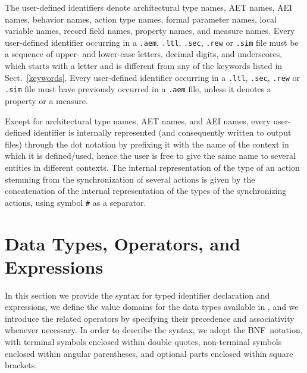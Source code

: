 The user-defined identifiers denote architectural type names, AET names, AEI names, behavior names, action
type names, formal parameter names, local variable names, record field names, property names, and measure
names. Every user-defined identifier occurring in a {\tt .aem}, {\tt .ltl}, {\tt .sec}, {\tt .rew} or
{\tt .sim} file must be a sequence of upper- and lower-case letters, decimal digits, and underscores, which
starts with a letter and is different from any of the keywords listed in Sect.~\ref{keywords}. Every
user-defined identifier occurring in a {\tt .ltl}, {\tt .sec}, {\tt .rew} or {\tt .sim} file must have
previously occurred in a {\tt .aem} file, unless it denotes a property or a measure.

Except for architectural type names, AET names, and AEI names, every user-defined identifier is internally
represented (and consequently written to output files) through the dot notation by prefixing it with the
name of the context in which it is defined/used, hence the user is free to give the same name to several
entities in different contexts. The internal representation of the type of an action stemming from the
synchronization of several actions is given by the concatenation of the internal representation of the types
of the synchronizing actions, using symbol {\tt \#} as a separator.



\section{Data Types, Operators, and Expressions}

In this section we provide the syntax for typed identifier declaration and expressions, we define the value
domains for the data types available in \aemilia, and we introduce the related operators by specifying their
precedence and associativity whenever necessary. In order to describe the syntax, we adopt the BNF~notation,
with terminal symbols enclosed within double quotes, non-terminal symbols enclosed within angular
parentheses, and optional parts enclosed within square brackets.


